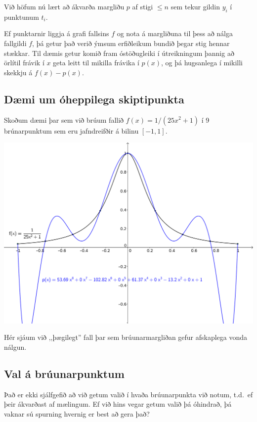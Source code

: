 \documentclass[letterpaper,10pt,icelandic]{sphinxmanual}
\begin{document}
Við höfum nú lært að ákvarða margliðu \(p\) af stigi \(\leq n\)
sem tekur gildin \(y_i\) í punktunum \(t_i\).

Ef punktarnir liggja á grafi fallsins \(f\) og nota á margliðuna til
þess að nálga fallgildi \(f\), þá getur það verið ýmsum erfiðleikum
bundið þegar stig hennar stækkar. Til dæmis getur komið fram
óstöðugleiki í útreikningum þannig að örlítil frávik í \(x\) geta
leitt til mikilla frávika í \(p(x)\), og þá hugsanlega í mikilli
skekkju á \(f(x)-p(x)\).


\subsection{Dæmi um óheppilega skiptipunkta}
\label{kafli03:daemi-um-oheppilega-skiptipunkta}
Skoðum dæmi þar sem við brúum fallið \(f(x) = 1/(25x^2+1)\) í 9
brúnarpunktum sem eru jafndreifðir á bilinu \([-1,1]\).

\includegraphics{vond_bruun1.png}

Hér sjáum við ,,þægilegt'' fall þar sem brúunarmargliðan gefur afskaplega
vonda nálgun.


\subsection{Val á brúunarpunktum}
\label{kafli03:val-a-bruunarpunktum}
Það er ekki sjálfgefið að við getum valið í hvaða brúunarpunkta við
notum, t.d. ef þeir ákvarðast af mælingum. Ef við hins vegar getum valið
þá óhindrað, þá vaknar sú spurning hvernig er best að gera það?

\end{document}
